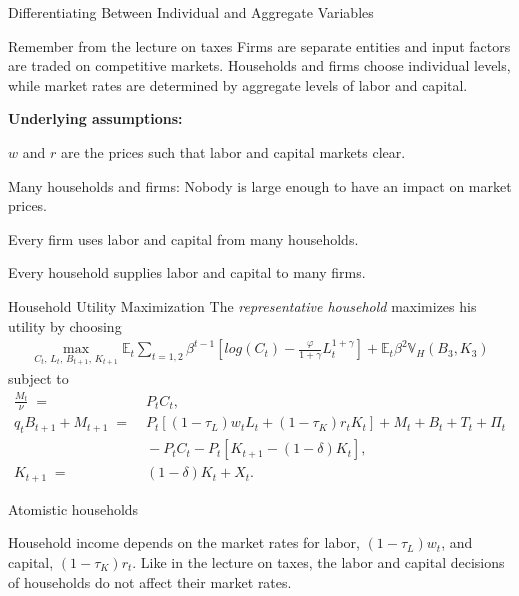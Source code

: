 \documentclass[10pt,c,aspectratio=1610,handout]{beamer}
\begin{document}
\begin{frame}{Differentiating Between Individual and Aggregate Variables}%
  \begin{block}{Remember from the lecture on taxes}%
    Firms are separate entities and input factors are traded on competitive markets. Households and firms choose individual levels, while market rates are determined by aggregate levels of labor and capital.%
  \end{block}%
  \vspace*{0.15in}%
  \pause%
  \textbf{Underlying assumptions:}%
  \begin{itemize}%
    \begin{small}%
      \item[$\blacktriangleright$] $w$ and $r$ are the prices such that labor and capital markets clear.%
      \item[$\blacktriangleright$] Many households and firms: Nobody is large enough to have an impact on market prices.%
      \item[$\blacktriangleright$] Every firm uses labor and capital from many households.%
      \item[$\blacktriangleright$] Every household supplies labor and capital to many firms.
    \end{small}%
  \end{itemize}%
\end{frame}%
\begin{frame}{Household Utility Maximization}%
  The \emph{representative household} maximizes his utility by choosing%
  \begin{align*}%
    \max_{C_t, \, L_t, \, B_{t+1}, \, K_{t+1}} \mathbb{E}_t \sum_{t=1,2} \beta^{t-1} \left[ log\left(C_t\right) - \frac{\varphi}{1+\gamma} L_t^{1+\gamma} \right] + \mathbb{E}_t \beta^2 \mathbb{V}_H \left(B_3,K_3\right)%
  \end{align*}%
  subject to%
  \begin{align*}%
    \frac{M_t}{\nu} \; = & \; P_t C_t,\\%
    q_{t} B_{t+1} + M_{t+1} \; = & \; P_t \left[ \left(1-\tau_L\right)w_t L_t + \left(1-\tau_K\right)r_t K_t\right] + M_t + B_t + T_t + \Pi_t\\%
    & \;  - P_t C_t - P_t \left[ K_{t+1} - \left(1-\delta\right) K_t \right],\\%
    K_{t+1} \; = & \; \left(1-\delta\right) K_t + X_t.%
  \end{align*}%
  \vspace*{0.1in}%
  \pause%
  \begin{block}{Atomistic households}%
    \begin{small}%
      Household income depends on the market rates for labor, $(1-\tau_L) w_t$, and capital, $(1-\tau_K) r_t$. Like in the lecture on taxes, the labor and capital decisions of households do not affect their market rates.%
    \end{small}%
  \end{block}%
\end{frame}%
\end{document}
